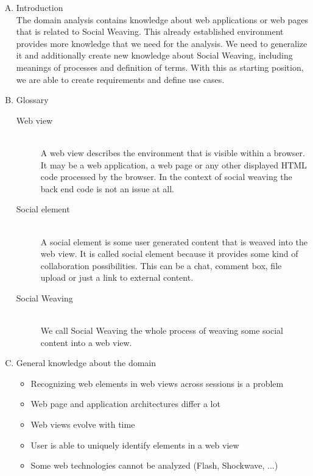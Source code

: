 \begin{enumerate}[A.]
\item Introduction\\
The domain analysis contains knowledge about web applications or web pages that is related to Social Weaving. This already established environment provides more knowledge that we need for the analysis. We need to generalize it and additionally create new knowledge about Social Weaving, including meanings of processes and definition of terms. With this as starting position, we are able to create requirements and define use cases. 
	
\item Glossary
\begin{description}
	\item[Web view]\mbox{}\\
		A web view describes the environment that is visible within a browser. It may be a web application, a web page or any other displayed HTML code processed by the browser. In the context of social weaving the back end code is not an issue at all. 
	
	\item[Social element]\mbox{}\\
		A social element is some user generated content that is weaved into the web view. It is called social element because it provides some kind of collaboration possibilities. This can be a chat, comment box, file upload or just a link to external content.
	
	\item[Social Weaving]\mbox{}\\
		We call Social Weaving the whole process of weaving some social content into a web view. 
\end{description}
	
\item General knowledge about the domain\\
\begin{itemize}
	\item Recognizing web elements in web views across sessions is a problem
	\item Web page and application architectures differ a lot
	\item Web views evolve with time
	\item User is able to uniquely identify elements in a web view
	\item Some web technologies cannot be analyzed (Flash, Shockwave, ...)
\end{itemize}


\end{enumerate}
